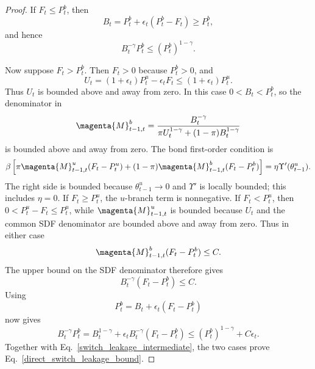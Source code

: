 \documentclass{article}
\def\green#1{#1}%
\begin{document}
\begin{proof}
\green{If} $\green{F}_\green{t\le P}_\green{t}^b$, \green{then}
\[
\green{B}_\green{t}
\green{=P}_\green{t}^\green{b+\epsilon}_\green{t}(\green{P}_\green{t}^\green{b-F}_\green{t})
\green{\ge P}_\green{t}^\green{b},
\]
\green{and hence}
\[
\green{B}_\green{t}^{-\green{\gamma}}\green{P}_\green{t}^\green{b}
\green{\le}(\green{P}_\green{t}^\green{b})^{\green{1-\gamma}}.
\]

\green{Now suppose} $\green{F}_\green{t>P}_\green{t}^\green{b}$.  \green{Then} $\green{F}_\green{t>0}$ \green{because} $\green{P}_\green{t}^\green{b>0}$, \green{and}
\[
\green{U}_\green{t}
\green{=}(\green{1+\epsilon}_\green{t})\green{P}_\green{t}^\green{u-\epsilon}_\green{tF}_\green{t}
\green{\le}
(\green{1+\epsilon}_\green{t})\green{P}_\green{t}^\green{u}.
\]
\green{Thus} $\green{U}_t$ is bounded \green{above and} away from zero.  \green{In this case} $\green{0<B}_\green{t<P}_\green{t}^\green{b}$, so the \green{denominator in}
\[
\magenta{\green{M}}_{\green{t-1},\green{t}}^\green{b}
\green{=}
\frac{\green{B}_\green{t}^{\green{-\gamma}}}
{\green{\pi U}_\green{t}^{\green{1-\gamma}}\green{+}(\green{1-\pi})\green{B}_\green{t}^{\green{1-\gamma}}}
\]
\green{is bounded above and away from zero}.  \green{The bond first-order condition is}
\[
\green{\beta}\left[
\green{\pi} \magenta{\green{M}}_{\green{t-1},\green{t}}^\green{u}(\green{F}_\green{t-P}_\green{t}^\green{u})
\green{+}(\green{1-\pi})\magenta{\green{M}}_{\green{t-1},\green{t}}^\green{b}(\green{F}_\green{t-P}_\green{t}^\green{b})
\right]
\green{=}
\green{\eta}\Upsilon'(\green{\theta}_{\green{t-1}}^\green{u}).
\]
\green{The right side is bounded because} $\green{\theta}_{\green{t-1}}^\green{u\to0}$ \green{and} $\Upsilon'$ \green{is locally bounded}; \green{this includes} $\green{\eta=0}$.  \green{If} $\green{F}_\green{t\ge P}_\green{t}^\green{u}$, \green{the} $\green{u}$\green{-branch term is nonnegative}.  \green{If} $\green{F}_\green{t<P}_\green{t}^\green{u}$, \green{then} $\green{0<P}_\green{t}^\green{u-F}_\green{t\le P}_\green{t}^\green{u}$, \green{while} $\magenta{\green{M}}_{\green{t-1},\green{t}}^\green{u}$ \green{is bounded because} $\green{U}_\green{t}$ \green{and the common SDF denominator are bounded above and away from zero}.  \green{Thus in either case}
\[
\magenta{\green{M}}_{\green{t-1},\green{t}}^\green{b}(\green{F}_\green{t-P}_\green{t}^\green{b})\green{\le C}.
\]
\green{The upper} bound \green{on the SDF denominator therefore gives}
\[
\green{B}_\green{t}^{\green{-\gamma}}(\green{F}_\green{t-P}_\green{t}^\green{b})\green{\le C}.
\]
\green{Using}
\[
\green{P}_\green{t}^\green{b=B}_\green{t+\epsilon}_\green{t}(\green{F}_\green{t-P}_\green{t}^\green{b})
\]
\green{now gives}
\[
\green{B}_\green{t}^{\green{-\gamma}}\green{P}_\green{t}^\green{b}
\green{=}
\green{B}_\green{t}^{\green{1-\gamma}}
\green{+\epsilon}_\green{tB}_\green{t}^{\green{-\gamma}}(\green{F}_\green{t-P}_\green{t}^\green{b})
\green{\le}
(\green{P}_\green{t}^\green{b})^{\green{1-\gamma}}\green{+C\epsilon}_\green{t}.
\]
\green{Together with Eq}.~\green{\eqref{switch_leakage_intermediate}}, \green{the two cases prove Eq}.~\green{\eqref{direct_switch_leakage_bound}}.


\end{proof}
\end{document}
